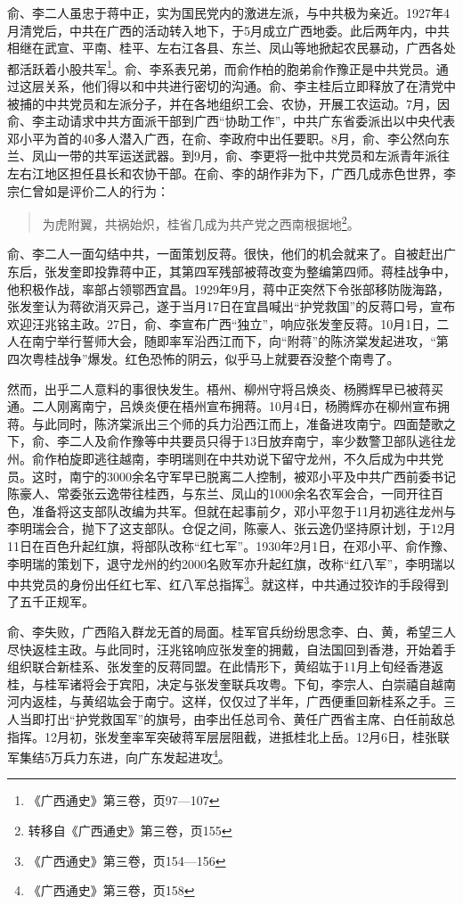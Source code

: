 俞、李二人虽忠于蒋中正，实为国民党内的激进左派，与中共极为亲近。1927年4月清党后，中共在广西的活动转入地下，于5月成立广西地委。此后两年内，中共相继在武宣、平南、桂平、左右江各县、东兰、凤山等地掀起农民暴动，广西各处都活跃着小股共军\footnote{《广西通史》第三卷，页97—107}。俞、李系表兄弟，而俞作柏的胞弟俞作豫正是中共党员。通过这层关系，他们得以和中共进行密切的沟通。俞、李主桂后立即释放了在清党中被捕的中共党员和左派分子，并在各地组织工会、农协，开展工农运动。7月，因俞、李主动请求中共方面派干部到广西“协助工作”，中共广东省委派出以中央代表邓小平为首的40多人潜入广西，在俞、李政府中出任要职。8月，俞、李公然向东兰、凤山一带的共军运送武器。到9月，俞、李更将一批中共党员和左派青年派往左右江地区担任县长和农协干部。在俞、李的胡作非为下，广西几成赤色世界，李宗仁曾如是评价二人的行为：

\begin{quote}
为虎附翼，共祸始炽，桂省几成为共产党之西南根据地\footnote{转移自《广西通史》第三卷，页155}。
\end{quote}

俞、李二人一面勾结中共，一面策划反蒋。很快，他们的机会就来了。自被赶出广东后，张发奎即投靠蒋中正，其第四军残部被蒋改变为整编第四师。蒋桂战争中，他积极作战，率部占领鄂西宜昌。1929年9月，蒋中正突然下令张部移防陇海路，张发奎认为蒋欲消灭异己，遂于当月17日在宜昌喊出“护党救国”的反蒋口号，宣布欢迎汪兆铭主政。27日，俞、李宣布广西“独立”，响应张发奎反蒋。10月1日，二人在南宁举行誓师大会，随即率军沿西江而下，向“附蒋”的陈济棠发起进攻，“第四次粤桂战争”爆发。红色恐怖的阴云，似乎马上就要吞没整个南粤了。

然而，出乎二人意料的事很快发生。梧州、柳州守将吕焕炎、杨腾辉早已被蒋买通。二人刚离南宁，吕焕炎便在梧州宣布拥蒋。10月4日，杨腾辉亦在柳州宣布拥蒋。与此同时，陈济棠派出三个师的兵力沿西江而上，准备进攻南宁。四面楚歌之下，俞、李二人及俞作豫等中共要员只得于13日放弃南宁，率少数警卫部队逃往龙州。俞作柏旋即逃往越南，李明瑞则在中共劝说下留守龙州，不久后成为中共党员。这时，南宁的3000余名守军早已脱离二人控制，被邓小平及中共广西前委书记陈豪人、常委张云逸带往桂西，与东兰、凤山的1000余名农军会合，一同开往百色，准备将这支部队改编为共军。但就在起事前夕，邓小平忽于11月初逃往龙州与李明瑞会合，抛下了这支部队。仓促之间，陈豪人、张云逸仍坚持原计划，于12月11日在百色升起红旗，将部队改称“红七军”。1930年2月1日，在邓小平、俞作豫、李明瑞的策划下，退守龙州的约2000名败军亦升起红旗，改称“红八军”，李明瑞以中共党员的身份出任红七军、红八军总指挥\footnote{《广西通史》第三卷，页154—156}。就这样，中共通过狡诈的手段得到了五千正规军。

俞、李失败，广西陷入群龙无首的局面。桂军官兵纷纷思念李、白、黄，希望三人尽快返桂主政。与此同时，汪兆铭响应张发奎的拥戴，自法国回到香港，开始着手组织联合新桂系、张发奎的反蒋同盟。在此情形下，黄绍竑于11月上旬经香港返桂，与桂军诸将会于宾阳，决定与张发奎联兵攻粤。下旬，李宗人、白崇禧自越南河内返桂，与黄绍竑会于南宁。这样，仅仅过了半年，广西便重回新桂系之手。三人当即打出“护党救国军”的旗号，由李出任总司令、黄任广西省主席、白任前敌总指挥。12月初，张发奎率军突破蒋军层层阻截，进抵桂北上岳。12月6日，桂张联军集结5万兵力东进，向广东发起进攻\footnote{《广西通史》第三卷，页158}。

